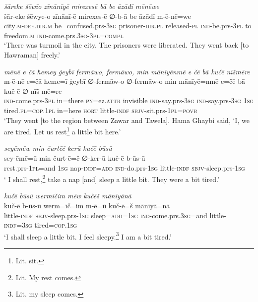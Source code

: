 \ea \label{BP.180}
\textit{šāreke šēwīo zīnānīyē mirexesē bā be āzāđī mēnēwe} \\ 
\gll šār-eke šēwye-o zīnānī-ē mirexes-ē ∅-b-ā be āzāđī m-ē-nē=we \\ 
 city\textsc{.m}\textsc{-def}\textsc{.dir}\textsc{.m} be\_confused.prs\textsc{-3sg} prisoner\textsc{-dir}\textsc{.pl} released\textsc{\textsc{-pl}} \textsc{ind-}be.prs\textsc{-3pl} to freedom\textsc{.m} \textsc{ind-}come.prs\textsc{.3sg}\textsc{-3pl}\textsc{=compl} \\ 
\glt `There was turmoil in the city. The prisoners were liberated. They went back [to Hawraman] freely.'
\z 
 
\ea \label{BP.181}
\textit{mēnē e čā ħemey ġeybī fermāwo, fermāwo, min mānīyēnmē e čē bā kučē nīšmēre} \\ 
\gll m-ē-nē e=čā ħeme=ī ġeybī ∅-fermāw-o ∅-fermāw-o min mānīyē=nmē e=čē bā kuč-ē ∅-nīš-mē=re \\ 
 \textsc{ind-}come.prs\textsc{-3pl} in=there \textsc{pn}=ez.\textsc{attr} invisible \textsc{ind-}say.prs\textsc{-3sg} \textsc{ind-}say.prs\textsc{-3sg} \textsc{1sg} tired\textsc{.pl}\textsc{=cop}\textsc{.\textsc{1pl}} in=here \textsc{hort} little\textsc{-indf} \textsc{sbjv-}sit.prs\textsc{-\textsc{1pl}}\textsc{=\textsc{povb}} \\ 
\glt `They went [to the region between Zawar and Tawela]. Hama Ghaybi said, ‘I, we are tired. Let us rest\footnote{Lit. sit.} a little bit here.'
\z 
 
\ea \label{BP.182}
\textit{seyēmēw min čurtēč kerū kučē būsū} \\ 
\gll sey-ēmē=ū min čurt-ē=č ∅-ker-ū kuč-ē b-ūs-ū \\ 
 rest.prs-\textsc{1pl}=and \textsc{1sg} nap\textsc{-indf}\textsc{=add} \textsc{ind-}do.prs\textsc{-\textsc{1sg}} little\textsc{-indf} \textsc{sbjv-}sleep.prs\textsc{-\textsc{1sg}} \\ 
\glt ` I shall rest,\footnote{Lit. My rest comes.} take a nap [and] sleep a little bit. They were a bit tired.'
\z 
 
\ea \label{BP.183}
\textit{kučē būsū wermīčim mēw kučēš mānīyānā} \\ 
\gll kuč-ē b-ūs-ū werm=īč=im m-ē=ū kuč-ē=š mānīyā=nā \\ 
 little\textsc{-indf} \textsc{sbjv-}sleep.prs\textsc{-\textsc{1sg}} sleep\textsc{=add}\textsc{=\textsc{1sg}} \textsc{ind-}come.prs\textsc{.3sg}=and little\textsc{-indf}\textsc{=3sg} tired\textsc{=cop}\textsc{.\textsc{1sg}} \\ 
\glt `I shall sleep a little bit. I feel sleepy.\footnote{Lit. my sleep comes.} I am a bit tired.'
\z 
 
